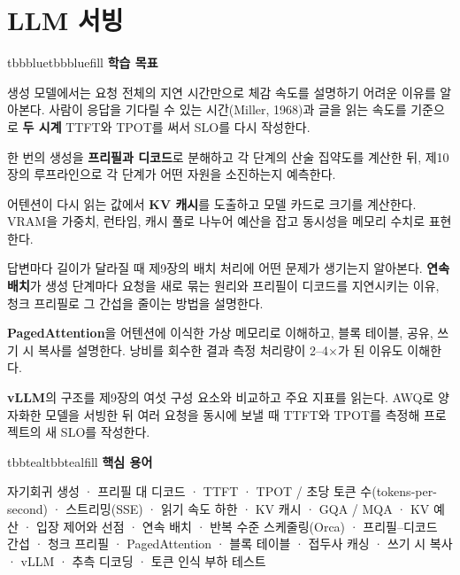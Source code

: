 \setcounter{chapter}{10}
\chapter{LLM 서빙}

\begin{calloutbox}{tbbblue}{tbbbluefill}
{\normalsize\bfseries\color{tbbblue}학습 목표}\par\vspace{3pt}
\begin{tbbitemize}
  \item 생성 모델에서는 요청 전체의 지연 시간만으로 체감 속도를 설명하기 어려운 이유를 알아본다. 사람이 응답을 기다릴 수 있는 시간(Miller, 1968)과 글을 읽는 속도를 기준으로 \textbf{두 시계} TTFT와 TPOT를 써서 SLO를 다시 작성한다.
  \item 한 번의 생성을 \textbf{프리필과 디코드}로 분해하고 각 단계의 산술 집약도를 계산한 뒤, 제10장의 루프라인으로 각 단계가 어떤 자원을 소진하는지 예측한다.
  \item 어텐션이 다시 읽는 값에서 \textbf{KV 캐시}를 도출하고 모델 카드로 크기를 계산한다. VRAM을 가중치, 런타임, 캐시 풀로 나누어 예산을 잡고 동시성을 메모리 수치로 표현한다.
  \item 답변마다 길이가 달라질 때 제9장의 배치 처리에 어떤 문제가 생기는지 알아본다. \textbf{연속 배치}가 생성 단계마다 요청을 새로 묶는 원리와 프리필이 디코드를 지연시키는 이유, 청크 프리필로 그 간섭을 줄이는 방법을 설명한다.
  \item \textbf{PagedAttention}을 어텐션에 이식한 가상 메모리로 이해하고, 블록 테이블, 공유, 쓰기 시 복사를 설명한다. 낭비를 회수한 결과 측정 처리량이 2–4×가 된 이유도 이해한다.
  \item \textbf{vLLM}의 구조를 제9장의 여섯 구성 요소와 비교하고 주요 지표를 읽는다. AWQ로 양자화한 모델을 서빙한 뒤 여러 요청을 동시에 보낼 때 TTFT와 TPOT를 측정해 프로젝트의 새 SLO를 작성한다.
\end{tbbitemize}
\end{calloutbox}

\vspace{2.5pt}

\begin{calloutbox}{tbbteal}{tbbtealfill}
{\normalsize\bfseries\color{tbbteal}핵심 용어}\par\vspace{3pt}
자기회귀 생성 · 프리필 대 디코드 · TTFT · TPOT / 초당 토큰 수(tokens-per-second) · 스트리밍(SSE) · 읽기 속도 하한 · KV 캐시 · GQA / MQA · KV 예산 · 입장 제어와 선점 · 연속 배치 · 반복 수준 스케줄링(Orca) · 프리필–디코드 간섭 · 청크 프리필 · PagedAttention · 블록 테이블 · 접두사 캐싱 · 쓰기 시 복사 · vLLM · 추측 디코딩 · 토큰 인식 부하 테스트
\end{calloutbox}

